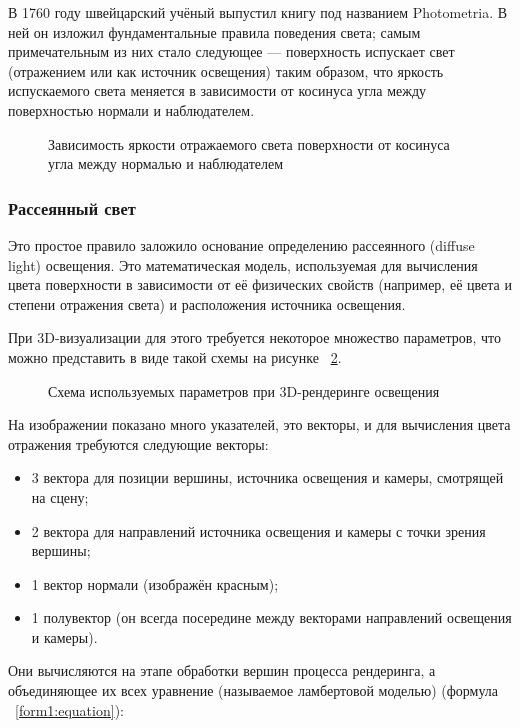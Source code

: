 В 1760 году швейцарский учёный выпустил книгу под названием Photometria. В ней он изложил фундаментальные правила поведения света; самым примечательным из них стало следующее — поверхность испускает свет (отражением или как источник освещения) таким образом, что яркость испускаемого света меняется в зависимости от косинуса угла между поверхностью нормали и наблюдателем.

\begin{figure}[H]
	\caption{Зависимость яркости отражаемого света поверхности от косинуса угла между нормалью и наблюдателем}
	\label{diagram9:image}
\end{figure}

\subsubsection{Рассеянный свет}

Это простое правило заложило основание определению рассеянного (diffuse light) освещения. Это математическая модель, используемая для вычисления цвета поверхности в зависимости от её физических свойств (например, её цвета и степени отражения света) и расположения источника освещения.

При 3D-визуализации для этого требуется некоторое множество параметров, что можно представить в виде такой схемы на рисунке ~\ref{diagram10:image}.

\begin{figure}[H]
	\caption{Схема используемых параметров при 3D-рендеринге освещения}
	\label{diagram10:image}
\end{figure}

На изображении показано много указателей, это векторы, и для вычисления цвета отражения требуются следующие векторы:
\begin{itemize}
	\item 3 вектора для позиции вершины, источника освещения и камеры, смотрящей на сцену;
	\item 2 вектора для направлений источника освещения и камеры с точки зрения вершины;
	\item 1 вектор нормали (изображён красным);
	\item 1 полувектор (он всегда посередине между векторами направлений освещения и камеры).
\end{itemize}

Они вычисляются на этапе обработки вершин процесса рендеринга, а объединяющее их всех уравнение  (называемое ламбертовой моделью) (формула ~\ref{form1:equation}):

